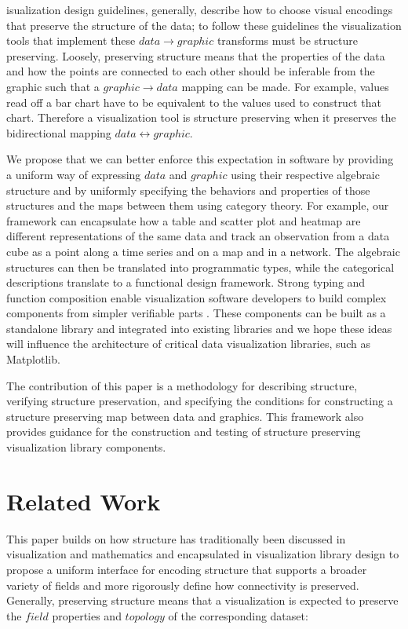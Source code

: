 \documentclass[journal]{IEEEtran}
\theoremstyle{definition}
\theoremstyle{remark}
\begin{document}
isualization design guidelines, generally, describe how to choose visual encodings that preserve the structure of the data; to follow these guidelines the visualization tools that implement these $data \rightarrow graphic$ transforms must be structure preserving. Loosely, preserving structure means that the properties of the data and how the points are connected to each other should be inferable from the graphic such that a $graphic \rightarrow data$ mapping can be made. For example, values read off a bar chart have to be equivalent to the values used to construct that chart. Therefore a visualization tool is structure preserving when it preserves the bidirectional mapping $data\leftrightarrow graphic$.

We propose that we can better enforce this expectation in software by providing a uniform way of expressing $data$ and $graphic$ using their respective algebraic structure and by uniformly specifying the behaviors and properties of those structures and the maps between them using category theory. For example, our framework can encapsulate how a table and scatter plot and heatmap are different representations of the same data and track an observation from a data cube as a point along a time series and on a map and in a network. The algebraic structures can then be translated into programmatic types, while the categorical descriptions translate to a functional design framework. Strong typing and function composition enable visualization software developers to build complex components from simpler verifiable parts \cite{huHowFunctionalProgramming2015, hughesWhyFunctionalProgramming1989}. These components can be built as a standalone library and integrated into existing libraries and we hope these ideas will influence the architecture of critical data visualization libraries, such as Matplotlib.

The contribution of this paper is a methodology for describing structure, verifying structure preservation, and specifying the conditions for constructing a structure preserving map between data and graphics. This framework also provides guidance for the construction and testing of structure preserving visualization library components.

\section{Related Work}
\label{sec:related-work}

This paper builds on how structure has traditionally been discussed in visualization and mathematics and encapsulated in visualization library design to propose a uniform interface for encoding structure that supports a broader variety of fields and more rigorously define how connectivity is preserved. Generally, preserving structure means that a visualization is expected to preserve the $field$ properties and $topology$ of the corresponding dataset:
\end{document}
